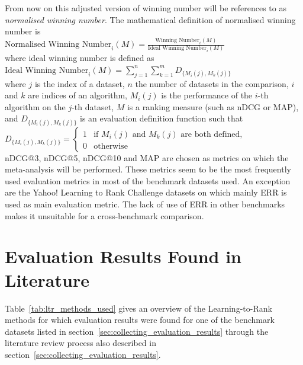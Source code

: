 From now on this adjusted version of winning number will be references to as \emph{normalised winning number}. The mathematical definition of normalised winning number is\\

$\text{Normalised Winning Number}_i(M) = \frac{\text{Winning Number}_i(M)}{\text{Ideal Winning Number}_i(M)}$\\

\noindent
where ideal winning number is defined as\\

$\text{Ideal Winning Number}_i(M) = \sum\nolimits_{j=1}^n \sum\nolimits_{k=1}^m D_{\{M_i(j),M_k(j)\}}$\\

where $j$ is the index of a dataset, $n$ the number of datasets in the comparison, $i$ and $k$ are indices of an algorithm, $M_i(j)$ is the performance of the $i$-th algorithm on the $j$-th dataset, $M$ is a ranking measure (such as \ac{nDCG} or \ac{MAP}), and $D_{\{M_i(j),M_k(j)\}}$ is an evaluation definition function such that\\

$D_{\{M_i(j),M_k(j)\}} = \begin{cases}
1 & \text{if } M_i(j) \text{ and } M_k(j) \text{ are both defined}, \\
0 & \text{otherwise}
\end{cases}$\\

\acs{nDCG}@3, \acs{nDCG}@5, \acs{nDCG}@10 and \acs{MAP} are chosen as metrics on which the meta-analysis will be performed. These metrics seem to be the most frequently used evaluation metrics in most of the benchmark datasets used. An exception are the Yahoo! Learning to Rank Challenge datasets on which mainly \ac{ERR} is used as main evaluation metric. The lack of use of \ac{ERR} in other benchmarks makes it unsuitable for a cross-benchmark comparison.

\section{Evaluation Results Found in Literature}
Table~\ref{tab:ltr_methods_used} gives an overview of the Learning-to-Rank methods for which evaluation results were found for one of the benchmark datasets listed in section~\ref{sec:collecting_evaluation_results} through the literature review process also described in section~\ref{sec:collecting_evaluation_results}.\\

